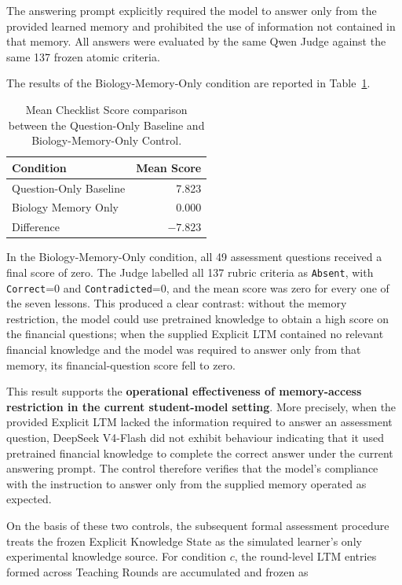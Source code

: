 The answering prompt explicitly required the model to answer only from the provided learned memory and prohibited the use of information not contained in that memory. All answers were evaluated by the same Qwen Judge against the same 137 frozen atomic criteria.

The results of the Biology-Memory-Only condition are reported in Table~\ref{tab:pretrained-memory-controls}.

\begin{table}[H]
\centering
\caption{Mean Checklist Score comparison between the Question-Only Baseline and Biology-Memory-Only Control.}
\label{tab:pretrained-memory-controls}
\small
\begin{tabular}{lr}
\toprule
\textbf{Condition} & \textbf{Mean Score} \\
\midrule
Question-Only Baseline & 7.823 \\
Biology Memory Only & 0.000 \\
Difference & $-7.823$ \\
\bottomrule
\end{tabular}
\end{table}

In the Biology-Memory-Only condition, all 49 assessment questions received a final score of zero. The Judge labelled all 137 rubric criteria as \texttt{Absent}, with \texttt{Correct}=0 and \texttt{Contradicted}=0, and the mean score was zero for every one of the seven lessons. This produced a clear contrast: without the memory restriction, the model could use pretrained knowledge to obtain a high score on the financial questions; when the supplied Explicit LTM contained no relevant financial knowledge and the model was required to answer only from that memory, its financial-question score fell to zero.

This result supports the \textbf{operational effectiveness of memory-access restriction in the current student-model setting}. More precisely, when the provided Explicit LTM lacked the information required to answer an assessment question, DeepSeek V4-Flash did not exhibit behaviour indicating that it used pretrained financial knowledge to complete the correct answer under the current answering prompt. The control therefore verifies that the model's compliance with the instruction to answer only from the supplied memory operated as expected.

On the basis of these two controls, the subsequent formal assessment procedure treats the frozen Explicit Knowledge State as the simulated learner's only experimental knowledge source. For condition $c$, the round-level LTM entries formed across Teaching Rounds are accumulated and frozen as

